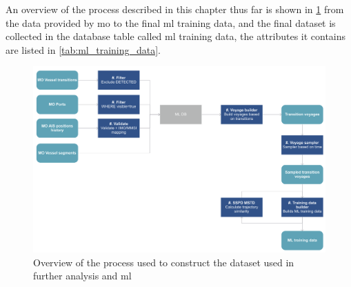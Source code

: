 An overview of the process described in this chapter thus far is shown in \cref{fig:dataset_overview} from the data provided by \acrfull{mo} to the final \acrshort{ml} training data, and the final dataset is collected in the database table called \acrshort{ml} training data, the attributes it contains are listed in \cref{tab:ml_training_data}.

\begin{figure}[htbp]  %
    \centering
    \includegraphics[width=1.0\textwidth]{figures/dataset_overview}
    \caption{Overview of the process used to construct the dataset used in further analysis and \acrshort{ml}}
    \label{fig:dataset_overview}
\end{figure}

